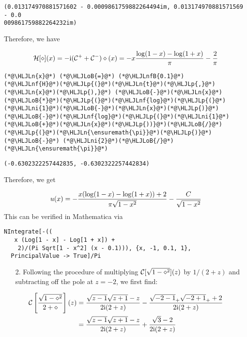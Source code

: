 \documentclass[12pt,landscape]{article}
\newcommand{\HLJLn}[1]{#1}
\newcommand{\HLJLnf}[1]{\textcolor[RGB]{66,102,213}{#1}}
\newcommand{\HLJLnfB}[1]{\textcolor[RGB]{59,151,46}{#1}}
\newcommand{\HLJLni}[1]{\textcolor[RGB]{59,151,46}{#1}}
\newcommand{\HLJLoB}[1]{\textcolor[RGB]{102,102,102}{\textbf{#1}}}
\newcommand{\HLJLp}[1]{#1}
\def\I{ {\rm i} }
\def\CC{ {\cal C} }
\def\HH{ {\cal H} }
\begin{document}
{\begin{lstlisting}
(0.013174970881571602 - 0.0009861759882264494im, 0.013174970881571569 - 0.0
009861759882264232im)
\end{lstlisting}


Therefore, we have

\[
\HH[\diamond](x) = -\I (\CC^+ + \CC^-) \diamond(x) = -x {\log(1-x) - \log(1+x) \over \pi} -{2 \over \pi}
\]

\begin{lstlisting}
(*@\HLJLn{x}@*) (*@\HLJLoB{=}@*) (*@\HLJLnfB{0.1}@*)
(*@\HLJLnf{H}@*)(*@\HLJLp{(}@*)(*@\HLJLn{t}@*)(*@\HLJLp{,}@*)(*@\HLJLn{x}@*)(*@\HLJLp{),}@*) (*@\HLJLoB{-}@*)(*@\HLJLn{x}@*)(*@\HLJLoB{*}@*)(*@\HLJLp{(}@*)(*@\HLJLnf{log}@*)(*@\HLJLp{(}@*)(*@\HLJLni{1}@*)(*@\HLJLoB{-}@*)(*@\HLJLn{x}@*)(*@\HLJLp{)}@*)(*@\HLJLoB{-}@*)(*@\HLJLnf{log}@*)(*@\HLJLp{(}@*)(*@\HLJLni{1}@*)(*@\HLJLoB{+}@*)(*@\HLJLn{x}@*)(*@\HLJLp{))}@*)(*@\HLJLoB{/}@*)(*@\HLJLp{(}@*)(*@\HLJLn{\ensuremath{\pi}}@*)(*@\HLJLp{)}@*) (*@\HLJLoB{-}@*) (*@\HLJLni{2}@*)(*@\HLJLoB{/}@*)(*@\HLJLn{\ensuremath{\pi}}@*)
\end{lstlisting}

\begin{lstlisting}
(-0.6302322257442835, -0.6302322257442834)
\end{lstlisting}


Therefore, we get

\[
u(x) = - {x(\log(1-x) - \log(1+x))+2 \over  \pi\sqrt{1-x^2}} - {C \over \sqrt{1-x^2}}
\]
This can be verified in Mathematica via

\begin{verbatim}
NIntegrate[-((
   x (Log[1 - x] - Log[1 + x]) +
    2)/(Pi Sqrt[1 - x^2] (x - 0.1))), {x, -1, 0.1, 1},
  PrincipalValue -> True]/Pi
\end{verbatim}
\begin{itemize}
\item[2. ] Following the procedure of multiplying $\CC[\sqrt{1-\diamond^2}](z)$ by $1/(2+z)$ and subtracting off the pole at $z=-2$, we first find:

\end{itemize}
\begin{align*}
\CC\left[{\sqrt{1-\diamond^2} \over 2+\diamond}\right](z)& = {\sqrt{z-1}\sqrt{z+1} - z \over 2\I(2+z)} -{\sqrt{-2-1}_+ \sqrt{-2+1}_+ +2 \over 2\I(2+z)}\\
& = {\sqrt{z-1}\sqrt{z+1} - z \over 2\I(2+z)} +{ \sqrt{3} -2 \over 2\I(2+z)}
\end{align*}

}
\end{document}
